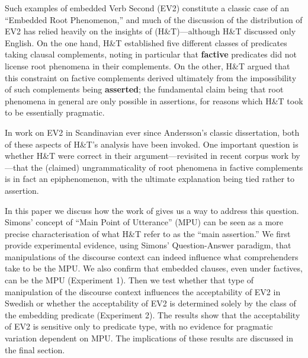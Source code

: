 \documentclass[output=paper]{LSP/langsci}
\begin{document}
\begin{exe}
\ex \label{hansa}
\begin{xlist}
\end{xlist}
\end{exe}
Such examples of embedded Verb Second (EV2) constitute a classic case of an ``Embedded Root Phenomenon,'' and much of the discussion of the distribution of EV2 has relied heavily on the insights of \cite{hooper-thompson73} (H\&T)---although H\&T discussed only English.  On the one hand, H\&T established five different classes of predicates taking clausal complements, noting in particular that \textbf{factive} predicates did not license root phenomena in their complements. On the other, H\&T argued that this constraint on factive complements derived ultimately from the impossibility of such complements being \textbf{asserted}; the fundamental claim being that root phenomena in general are only possible in assertions, for reasons which H\&T took to be essentially pragmatic.  

In work on EV2 in Scandinavian ever since Andersson's \citeyear{andersson75} classic dissertation, both of these aspects of H\&T's analysis have been invoked. One important question is whether H\&T were correct in their argument---revisited in recent corpus work by \cite{jensen-christensen13}---that the (claimed) ungrammaticality of root phenomena in factive complements is in fact an epiphenomenon, with the ultimate explanation being tied rather to assertion.

In this paper we discuss how the work of \cite{simons07,simons-etal10} 
gives us a way to address this question. Simons' concept of ``Main Point of Utterance'' (MPU) can be seen as a more precise characterisation of what H\&T refer to as the ``main assertion.''  We first provide experimental evidence, using Simons' Question-Answer paradigm, that manipulations of the discourse context can indeed influence what comprehenders take to be the MPU. We also confirm that embedded clauses, even under factives, can be the MPU (Experiment 1). Then we test whether that type of manipulation of the discourse context influences the acceptability of EV2 in Swedish or whether the acceptability of EV2 is determined solely by the class of the embedding predicate (Experiment 2).  The results show that the acceptability of EV2 is sensitive only to predicate type, with no evidence for pragmatic variation dependent on MPU. The implications of these results are discussed in the final section.
\end{document}
